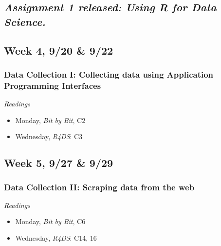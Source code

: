 \documentclass[
  10pt,
]{article}
\providecommand{\tightlist}{%
  \setlength{\itemsep}{0pt}\setlength{\parskip}{0pt}}
\begin{document}
\hypertarget{assignment-1-released-using-r-for-data-science.}{%
\subsection{\texorpdfstring{\emph{Assignment 1 released: Using R for
Data
Science.}}{Assignment 1 released: Using R for Data Science.}}\label{assignment-1-released-using-r-for-data-science.}}

\hypertarget{week-4-920-922}{%
\subsection{Week 4, 9/20 \& 9/22}\label{week-4-920-922}}

\hypertarget{data-collection-i-collecting-data-using-application-programming-interfaces}{%
\subsubsection{Data Collection I: Collecting data using Application
Programming
Interfaces}\label{data-collection-i-collecting-data-using-application-programming-interfaces}}

\emph{Readings}

\begin{itemize}
\tightlist
\item
  Monday, \emph{Bit by Bit}, C2
\item
  Wednesday, \emph{R4DS}: C3
\end{itemize}

\hypertarget{week-5-927-929}{%
\subsection{Week 5, 9/27 \& 9/29}\label{week-5-927-929}}

\hypertarget{data-collection-ii-scraping-data-from-the-web}{%
\subsubsection{Data Collection II: Scraping data from the
web}\label{data-collection-ii-scraping-data-from-the-web}}

\emph{Readings}

\begin{itemize}
\tightlist
\item
  Monday, \emph{Bit by Bit}, C6
\item
  Wednesday, \emph{R4DS}: C14, 16
\end{itemize}
\end{document}
